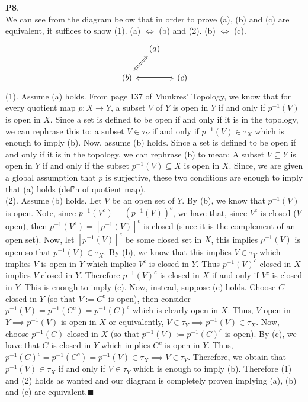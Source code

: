 \documentclass{article}
\begin{document}
    \textbf{P8}.\\
    We can see from the diagram below that in order to prove (a), (b) and (c) are equivalent, it suffices to show (1). (a) $\Leftrightarrow$ (b) and 
    (2). (b) $\Leftrightarrow$ (c).
    \begin{equation*}
        \begin{tikzcd}[column sep=small]
                         & (a) \arrow[dl, Leftrightarrow] & \\
            (b) \arrow[rr, Leftrightarrow] &              & (c)
        \end{tikzcd}
    \end{equation*}
    (1). Assume (a) holds. From page 137 of Munkres' Topology, we know that for every quotient map $p: X\to Y$, a subset $V$ of $Y$ is open in $Y$ if and only if
    $p^{-1}(V)$ is open in $X$. Since a set is defined to be open if and only if it is in the topology, we can rephrase this to: a subset $V\in\tau_Y$ if and only if 
    $p^{-1}(V)\in\tau_X$ which is enough to imply (b). Now, assume (b) holds. Since a set is defined to be open if and only if it is in the topology, we can rephrase
    (b) to mean: A subset $V\subseteq Y$ is open in $Y$ if and only if the subset $p^{-1}(V)\subseteq X$ is open in $X$. Since, we are given a global assumption
    that $p$ is surjective, these two conditions are enough to imply that (a) holds (def'n of quotient map).\\
    (2). Assume (b) holds. Let $V$ be an open set of $Y$. By (b), we know that $p^{-1}(V)$ is open. Note, since $p^{-1}(V^c) = (p^{-1}(V))^c$, we have that,
    since $V^c$ is closed ($V$ open), then $p^{-1}(V^c) = [p^{-1}(V)]^c$ is closed (since it is the complement of an open set). Now, let $[p^{-1}(V)]^c$ be some
    closed set in $X$, this implies $p^{-1}(V)$ is open so that $p^{-1}(V)\in\tau_X$. By (b), we know that this implies $V\in\tau_Y$ which implies $V$ is open in
    $Y$ which implies $V^c$ is closed in $Y$. Thus $p^{-1}(V)^c$ closed in $X$ implies $V$ closed in $Y$. Therefore $p^{-1}(V)^c$ is closed in $X$ if and only if
    $V^c$ is closed in $Y$. This is enough to imply (c). Now, instead, suppose (c) holds. Choose $C$ closed in $Y$ (so that $V := C^c$ is open), then 
    consider $p^{-1}(V) = p^{-1}(C^c) = p^{-1}(C)^c$ which is clearly open in $X$. Thus, $V$ open in $Y \implies p^{-1}(V)$ is open in $X$ or equivalently,
    $V\in\tau_Y \implies p^{-1}(V)\in\tau_X$.  Now, choose
    $p^{-1}(C)$ closed in $X$ (so that $p^{-1}(V) := p^{-1}(C)^c$ is open). By (c), we have that $C$ is closed in $Y$ which implies $C^c$ is open in $Y$. Thus,
    $p^{-1}(C)^c = p^{-1}(C^c) = p^{-1}(V)\in\tau_X \implies V\in\tau_Y$. Therefore, we obtain that $p^{-1}(V)\in\tau_X$ if and only if $V\in\tau_Y$ which is enough
    to imply (b). Therefore (1) and (2) holds as wanted and our diagram is completely proven implying (a), (b) and (c) are equivalent.\hfill$\blacksquare$\\
\end{document}
